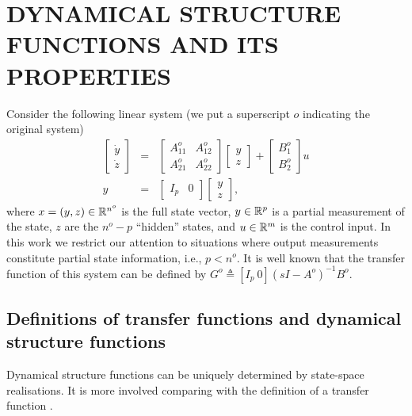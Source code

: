\documentclass[twocolumn,12pt]{autart}
\theoremstyle{plain}
\begin{document}
\section{DYNAMICAL STRUCTURE FUNCTIONS AND ITS PROPERTIES}\label{sec:systemmodel}
Consider the following linear system (we put a superscript $o$ indicating the original system)
\begin{equation}\label{eq:LTI}
 \begin{array}{cll}
   \left[\begin{array}{c}{\dot{y}}\\{\dot{z}} \end{array}\right]& = &
   \left[\begin{array}{cc}{A}^o_{11}&{A}^o_{12}\\{A}^o_{21}&{A}^o_{22}\end{array}\right]\left[\begin{array}{c}{y}\\{z}\end{array}\right]
   +\left[\begin{array}{c} {B}^o_{1}\\{B}^o_{2}\end{array}\right]{u} \\
   {y} & = &
   \left[\begin{array}{cc}{I}_p&{0}\end{array}\right]\left[\begin{array}{c}{y}\\{z}\end{array}\right],
   \end{array}
\end{equation}
where ${x}=({y},{z}) \in \Bbb R^{n^o}$ is the full
state vector, ${y}\in \Bbb R^p$ is a partial measurement of the
state, ${z}$ are the $n^o-p$ ``hidden'' states, and
${u}\in \Bbb R^m$ is the control input. In this work we restrict our attention to situations where output measurements constitute partial state information, i.e., $p< n^o$. It is well known that the transfer function of this system can be defined by $G^o\triangleq[I_p~0](sI-A^o)^{-1}B^o$. 

\subsection{Definitions of transfer functions and dynamical structure functions}
Dynamical structure functions can be uniquely determined by state-space realisations. It is more involved comparing with the definition of a transfer function \cite{08net_rec}.
\end{document}
